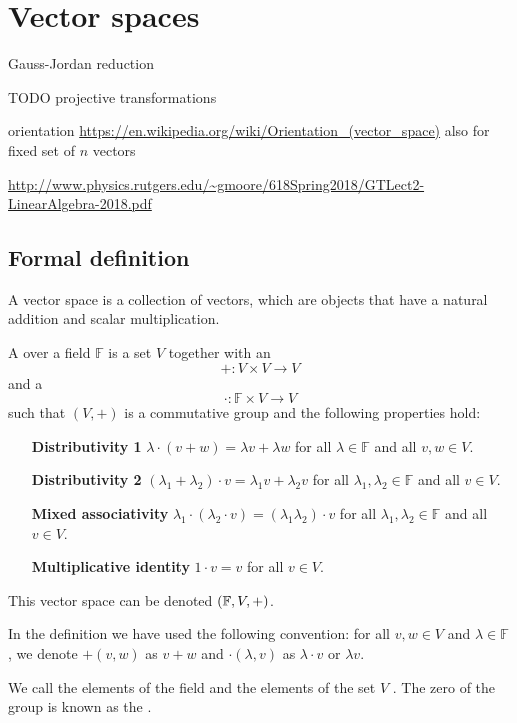 \chapter{Vector spaces}

Gauss-Jordan reduction

TODO projective transformations

orientation
\url{https://en.wikipedia.org/wiki/Orientation_(vector_space)}
also for fixed set of $n$ vectors

\url{http://www.physics.rutgers.edu/~gmoore/618Spring2018/GTLect2-LinearAlgebra-2018.pdf}

\section{Formal definition}
A vector space is a collection of vectors, which are objects that have a natural addition and scalar multiplication.
\begin{definition}
A  over a field $\mathbb{F}$ is a set $V$ together with an 
\[ +: V\times V \to V \]
and a 
\[ \cdot: \mathbb{F}\times V \to V \]
such that $(V,+)$ is a commutative group and the following properties hold:
\begin{itemize}[leftmargin=4cm]
\item[\textbf{Distributivity 1}] $\lambda\cdot(v+w) = \lambda v + \lambda w$ for all $\lambda \in \mathbb{F}$ and all $v,w \in V$.
\item[\textbf{Distributivity 2}] $(\lambda_1+\lambda_2)\cdot v = \lambda_1 v + \lambda_2 v$ for all $\lambda_1, \lambda_2 \in \mathbb{F}$ and all $v \in V$.
\item[\textbf{Mixed associativity}] $\lambda_1\cdot(\lambda_2\cdot v) = (\lambda_1 \lambda_2) \cdot v$ for all $\lambda_1, \lambda_2 \in \mathbb{F}$ and all $v \in V$.
\item[\textbf{Multiplicative identity}] $1\cdot v = v$ for all $v \in V$.
\end{itemize}
This vector space can be denoted $\left( \mathbb{F}, V, + \right)$.
\end{definition}
In the definition we have used the following convention: for all $v,w\in V$ and $\lambda\in \mathbb{F}$, we denote $+(v,w)$ as $v+w$ and $\cdot(\lambda, v)$ as $\lambda \cdot v$ or $\lambda v$.

We call the elements of the field  and the elements of the set $V$ . The zero of the group is known as the .

